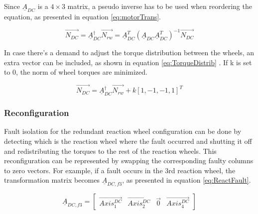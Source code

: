 
Since $\underline{A}_{DC} $ is a $ 4 \times 3 $ matrix, a pseudo inverse has to be used when reordering the equation, as presented in equation \ref{eq:motorTrans}. 

\begin{equation}
\label{eq:motorTrans}
\vec{N_{DC}} =  \underline{A}_{DC} ^\dagger \vec{N_{rw}}   =  \underline{A}_{DC}^T  (\underline{A}_{DC} \underline{A}_{DC} ^T)^{-1} \vec{N_{DC}}
\end{equation}



In case there's a demand to adjust the torque distribution between the wheels, an extra vector can be included, as shown in equation \ref{eq:TorqueDistrib}
\cite[equation 18.41-42]{SADC}. If k is set to 0, the norm of wheel torques are minimized.

\begin{equation}
\label{eq:TorqueDistrib}
 \vec{N_{DC}} = \underline{A}^\dagger_{DC} \vec{N_{rw}}  + k\left[1,-1,-1,1\right]^T
\end{equation}


\subsubsection{Reconfiguration}

Fault isolation for the redundant reaction wheel configuration can be done by detecting which is the reaction wheel where the fault occurred and shutting it off and redistributing the torques to the rest of the reaction wheels. This reconfiguration can be represented by swapping the corresponding faulty columns to zero vectors. For example, if a fault occurs in the 3rd reaction wheel, the transformation matrix becomes $\underline{A}_{DC,f3}$, as presented in equation \ref{eq:ReactFault}.

\begin{equation}
\label{eq:ReactFault}
\underline{A}_{DC,f3} = \begin{bmatrix}
\vec{Axis^{DC}_{1}}       & \vec{Axis^{DC}_{2}}   & \vec{0}   & \vec{Axis^{DC}_{4}} 
\end{bmatrix} 
\end{equation}


